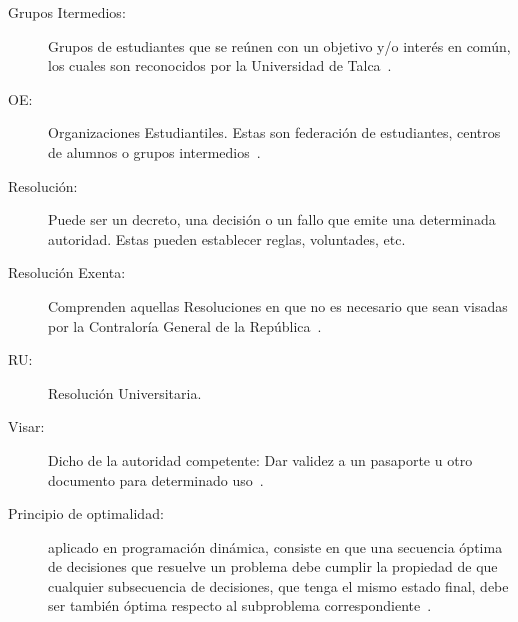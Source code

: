 \begin{glosario}
	\item 	\begin{description}
			\item[Grupos Itermedios:] Grupos de estudiantes que se reúnen con un objetivo y/o interés en común, los cuales son reconocidos por la Universidad de Talca~\cite{18}.
		\end{description}

	\item 	\begin{description}
			\item[OE:] Organizaciones Estudiantiles. Estas son federación de estudiantes, centros de alumnos o grupos intermedios~\cite{2}.
		\end{description}

	\item 	\begin{description}
			\item[Resolución:] Puede ser un decreto, una decisión o un fallo que emite una determinada autoridad. Estas pueden establecer reglas, voluntades, etc.
		\end{description}
	
	\item 	\begin{description}
			\item[Resolución Exenta:] Comprenden aquellas Resoluciones en que no es necesario que sean visadas por la Contraloría General de la República~\cite{3}.
		\end{description}
	
	\item 	\begin{description}
			\item[RU:] Resolución Universitaria.
		\end{description}

	\item 	\begin{description}
			    \item[Visar:] Dicho de la autoridad competente: Dar validez a un pasaporte u otro documento para determinado uso~\cite{4}.
			\end{description}

	\item 	\begin{description}
			    \item[Principio de optimalidad:] aplicado en programación dinámica, consiste en que una secuencia óptima de decisiones que resuelve un problema debe cumplir la propiedad de que cualquier subsecuencia de decisiones, que tenga el mismo estado final, debe ser también óptima respecto al subproblema correspondiente~\cite{21}.
			\end{description}  

\end{glosario}
